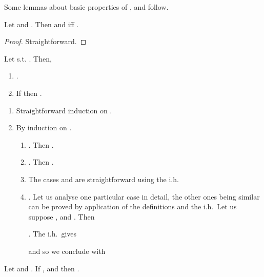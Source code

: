 \documentclass{LMCS}
\renewcommand{\>}{\rightarrow}
\newcommand{\ih}{i.h.}
\begin{document}
Some lemmas about basic properties of ,  and  follow.

\begin{lem}
\label{l:surf-snsudd-no-var}
Let  and . Then 
 and 
 iff .
\end{lem}

\begin{proof}
Straightforward.
\end{proof}


\begin{lem}
\label{l:surf-sub}
Let  s.t. . Then,
\begin{enumerate}[\rm(1)]
  \item \label{p:surf-sub-one}.
  \item \label{p:surf-sub-two}If  then 
        .
\end{enumerate}
\end{lem}

\proof \hfill
\begin{enumerate}[(1)]
\item Straightforward induction on . 
\item By induction on .
\begin{enumerate}[]
  \item .  Then . 
  \item .  Then .
\item The cases  and  are straightforward using the \ih
 \item . 
Let us analyse one particular case in detail, the other ones being similar
    can be proved by application of the definitions and the \ih\ Let us suppose 
  ,  and
  . Then 



. 
The  \ih\ gives 

  
  and so we conclude with
 
\end{enumerate}
\end{enumerate}


\begin{lem}
\label{l:surf-pred-sub}
Let  and . If ,
 and  then .
\end{lem}
\end{document}
